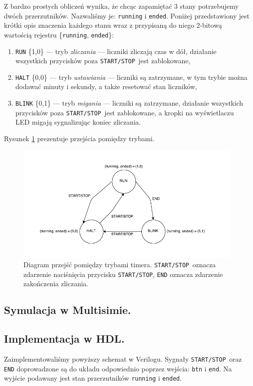 \documentclass[a4paper,oneside]{report}
\newcommand{\startstop}{\texttt{START/STOP}}
\begin{document}
Z bardzo prostych obliczeń wynika, że chcąc zapamiętać 3 stany
potrzebujemy dwóch przerzutników. Nazwaliśmy je: \texttt{running} i
\texttt{ended}. Poniżej przedstawiony jest krótki opis znaczenia
każdego stanu wraz z przypisaną do niego 2-bitową wartością
rejestru \{\texttt{running}, \texttt{ended}\}:
\begin{enumerate}
\item \texttt{RUN} \{1,0\} --- tryb \emph{zliczania} --- liczniki
zliczają czas w dół, działanie wszystkich przycisków poza
\startstop\ jest zablokowane,
\item \texttt{HALT} \{0,0\} --- tryb \emph{ustawiania} --- liczniki
są zatrzymane, w tym trybie można dodawać minuty i sekundy, a także
resetować stan liczników,
\item \texttt{BLINK} \{0,1\} --- tryb \emph{migania} --- liczniki
są zatrzymane, działanie wszystkich przycisków poza \startstop\
jest zablokowane, a kropki na wyświetlaczu LED migają sygnalizując
koniec zliczania.
\end{enumerate}

Rysunek \ref{state_diagram} prezentuje przejścia pomiędzy trybami.
\begin{figure}[p]
\centering
\includegraphics{state_diagram.pdf}
\caption[Diagram przejść pomiędzy trybami timera.]{Diagram przejść
pomiędzy trybami timera. \startstop\ oznacza zdarzenie naciśnięcia
przycisku \startstop , \texttt{END} oznacza zdarzenie zakończenia
zliczania.}
\label{state_diagram}
\end{figure}
\subsection{Symulacja w Multisimie.}
\subsection{Implementacja w HDL.}
Zaimplementowaliśmy powyższy schemat w Verilogu. Sygnały
\startstop\ oraz \texttt{END} doprowadzone są do układu
odpowiednio poprzez wejścia: \texttt{btn} i
\texttt{end\textunderscore}. Na wyjście podawany jest stan
przerzutników \texttt{running} i \texttt{ended}.
\end{document}
